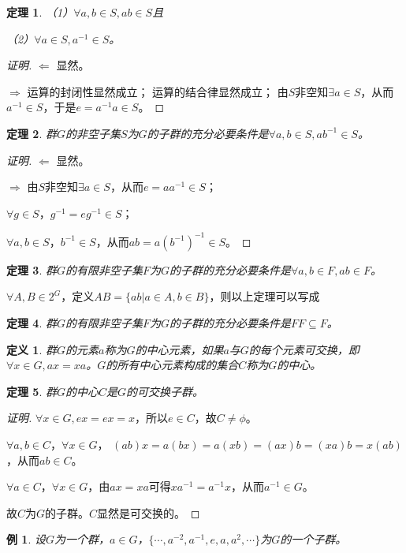 \documentclass{article}
\newtheorem{Def}{定义}
\newtheorem{Thm}{定理}
\newtheorem*{Example}{例}
\begin{document}
\begin{CJK*}{UTF8}{gbsn}
\begin{Thm}
  （1）$\forall a,b\in S, ab\in S$且

  （2）$\forall a\in S, a^{-1}\in S$。
 \end{Thm}
\begin{proof}[证明]
  $\Leftarrow$ 显然。

  $\Rightarrow$
  运算的封闭性显然成立；
  运算的结合律显然成立；
  由$S$非空知$\exists a\in S$，从而$a^{-1}\in S$，于是$e=a^{-1}a\in S$。
\end{proof}
 \begin{Thm}
  群$G$的非空子集$S$为$G$的子群的充分必要条件是$\forall a,b\in S, ab^{-1}\in S$。
 \end{Thm}
 \begin{proof}[证明]
  $\Leftarrow$ 显然。

  $\Rightarrow$
  由$S$非空知$\exists a\in S$，从而$e=aa^{-1}\in S$；

  $\forall g\in S$，$g^{-1}=eg^{-1}\in S$；

  $\forall a,b\in S$，$b^{-1}\in S$，从而$ab=a(b^{-1})^{-1}\in S$。
\end{proof}

 \begin{Thm}
  群$G$的有限非空子集$F$为$G$的子群的充分必要条件是$\forall a,b\in F, ab\in F$。
 \end{Thm}

 $\forall A,B\in 2^G$，定义$AB=\{ab|a\in A,b\in B\}$，则以上定理可以写成

 \begin{Thm}
  群$G$的有限非空子集$F$为$G$的子群的充分必要条件是$FF\subseteq F$。
 \end{Thm}
 \begin{Def}
  群$G$的元素$a$称为$G$的中心元素，如果$a$与$G$的每个元素可交换，即$\forall x\in G, ax=xa$。$G$的所有中心元素构成的集合$C$称为$G$的中心。
 \end{Def}
 \begin{Thm}
  群$G$的中心$C$是$G$的可交换子群。
 \end{Thm}
\begin{proof}[证明]
$\forall x\in G, ex=ex=x$，所以$e\in C$，故$C\neq \phi$。

$\forall a,b\in C$，$\forall x\in G$，
$(ab)x=a(bx)=a(xb)=(ax)b=(xa)b=x(ab)$，从而$ab\in C$。

$\forall a\in C$，$\forall x\in G$，由$ax=xa$可得$xa^{-1}=a^{-1}x$，从而$a^{-1}\in G$。

故$C$为$G$的子群。$C$显然是可交换的。
\end{proof}
\begin{Example}
  设$G$为一个群，$a\in G$，$\{\cdots,a^{-2},a^{-1},e,a,a^2,\cdots\}$为$G$的一个子群。
\end{Example}


\end{CJK*}
\end{document}
